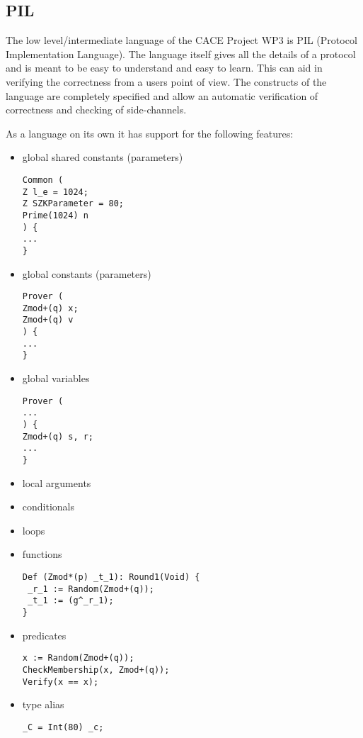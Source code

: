 \subsection{PIL}

The low level/intermediate language of the CACE Project WP3 is PIL (Protocol
Implementation Language). The language itself gives all the details of
a protocol and is meant to be easy to understand and easy to
learn. This can aid in verifying the correctness from a users point of
view. The constructs of the language are completely specified and
allow an automatic verification of correctness and checking of
side-channels.

As a language on its own it has support for the following features:
\begin{itemize}
\item global shared constants (parameters)
\begin{lstlisting}[language=PIL]
Common (
Z l_e = 1024;
Z SZKParameter = 80;
Prime(1024) n
) {
...
}
\end{lstlisting}

\item global constants (parameters)
\begin{lstlisting}[language=PIL]
Prover (
Zmod+(q) x;
Zmod+(q) v
) {
...
}
\end{lstlisting}

\item global variables
\begin{lstlisting}[language=PIL]
Prover (
...
) {
Zmod+(q) s, r;
...
}
\end{lstlisting}

\item local arguments

\item conditionals
\item loops

\item functions
\begin{lstlisting}[language=PIL]
Def (Zmod*(p) _t_1): Round1(Void) {
 _r_1 := Random(Zmod+(q));
 _t_1 := (g^_r_1);
}
\end{lstlisting}

\item predicates
\begin{lstlisting}
x := Random(Zmod+(q));
CheckMembership(x, Zmod+(q));
Verify(x == x);
\end{lstlisting}

\item type alias
\begin{lstlisting}
_C = Int(80) _c;
\end{lstlisting}

\end{itemize}

